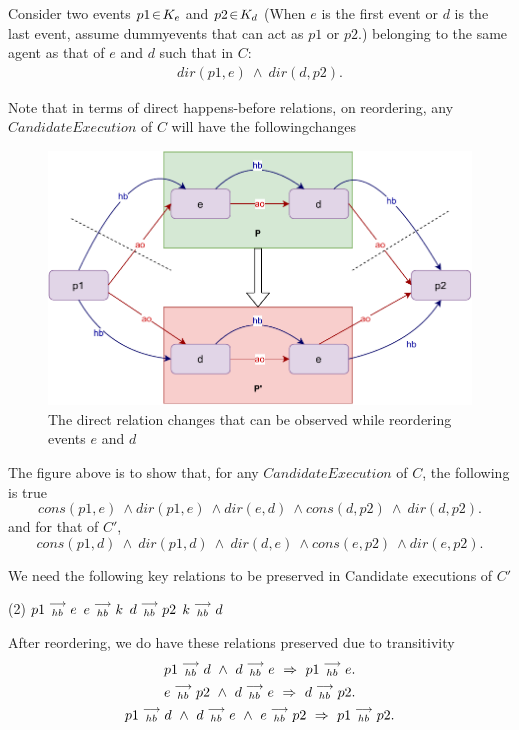     Consider two events $p1\!\in\!K_e$ and $p2\!\in\!K_d$ (When $e$ is the first event or $d$ is the last event, assume dummyevents that can act as $p1$ or $p2$.) belonging to the same agent as that of $e$ and $d$ such that in $C$:
    \begin{align*}
        dir(p1,e)\ \wedge\ dir(d,p2).
    \end{align*}
    
    Note that in terms of direct happens-before relations, on reordering, any $Candidate Execution$ of $C$ will have the followingchanges
    \begin{figure}[H]
        \centering
        \includegraphics[scale=0.7]{InstructionReordering/ValidReorderingProof/ProofParts/Part1/part1(b).pdf}
        \caption{The direct relation changes that can be observed while reordering events $e$ and $d$}
        \label{fig:my_label}
    \end{figure}
    
    The figure above is to show that, for any $Candidate Execution$ of $C$, the following is true
    \[
        cons(p1,e) \ \wedge dir(p1,e) \ \wedge dir(e,d) \ \wedge cons(d,p2) \ \wedge \ dir(d,p2).
    \]
    and for that of $C'$,
    \[
        cons(p1,d) \ \wedge \ dir(p1,d) \ \wedge \ dir(d,e) \ \wedge cons(e,p2) \ \wedge dir(e,p2).
    \]
    
    We need the following key relations to be preserved in Candidate executions of $C'$ 
    \begin{tasks}(2)
        \task $p1\stackrel{\longrightarrow}{_{hb}}e$
        \task $e\stackrel{\longrightarrow}{_{hb}}k$
        \task $d\stackrel{\longrightarrow}{_{hb}}p2$
        \task $k\stackrel{\longrightarrow}{_{hb}}d$ 
    \end{tasks}

    After reordering, we do have these relations preserved due to transitivity  
    \begin{gather*}
        \reln{p1}{hb}{d} \ \wedge \ \reln{d}{hb}{e} \ \Rightarrow \ \reln{p1}{hb}{e}. \\
        \reln{e}{hb}{p2} \ \wedge \ \reln{d}{hb}{e} \ \Rightarrow \ \reln{d}{hb}{p2}. \\
        \reln{p1}{hb}{d} \ \wedge \ \reln{d}{hb}{e} \ \wedge \ \reln{e}{hb}{p2} \ \Rightarrow \ \reln{p1}{hb}{p2}. 
    \end{gather*}

